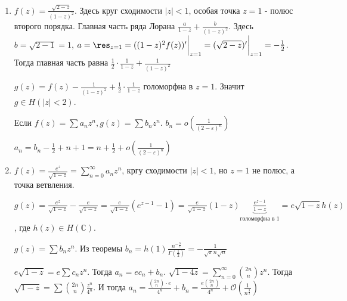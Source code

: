 \begin{example}
    \begin{enumerate}
        \item {
            $f(z) = \frac{\sqrt{2 - z}}{(1 - z)^2}$. Здесь круг сходимости $|z| < 1$, особая точка $z = 1$ - полюс второго порядка. Главная 
            часть ряда Лорана $\frac{a}{1 - z} + \frac{b}{(1 - z)^2}$. Здесь $b = \sqrt{2 - 1} = 1$, $a = \res_{z = 1} = ((1 - z)^2 f(z))' \bigg |_{z = 1} = (\sqrt{2 - z})' \bigg |_{z = 1} = -\frac{1}{2}$. Тогда
            главная часть равна $\frac{1}{2} \cdot \frac{1}{1 - z} + \frac{1}{(1 - z)^2}$

            $g(z) = f(z) - \frac{1}{(1 - z)^2} + \frac{1}{2} \cdot \frac{1}{1 - z}$ голоморфна в $z = 1$. Значит $g \in H(|z| < 2)$.

            Если $f(z) = \sum a_n z^n, g(z) = \sum b_n z^n$. $b_n = o\left ( \frac{1}{(2 - \varepsilon)^n} \right )$

            $a_n = b_n - \frac{1}{2} + n + 1 = n + \frac{1}{2} + o \left ( \frac{1}{(2 - \varepsilon)^n} \right )$
        }
        \item {
            $f(z) = \frac{e^z}{\sqrt{1 - z}} = \sum_{n = 0}^{\infty} a_n z^n$, кргу сходимости $|z| < 1$, но $z = 1$ не полюс, а точка ветвления.

            $g(z) = \frac{e^z}{\sqrt{1 - z}} - \frac{e}{\sqrt{1 - z}} = \frac{e}{\sqrt{1 - z}} (e^{z - 1} - 1) = \frac{e}{\sqrt{1 - z}} (1 - z) \underbrace{\frac{e^{z - 1}}{1 - z}}_{\text{голоморфна в 1}} = e\sqrt{1 - z} h(z)$, где $h(z) \in H(\mathbb{C})$.

            $g(z) = \sum b_n z^n$. Из теоремы $b_n = h(1) \frac{n^{-\frac{3}{2}}}{\Gamma (\frac{1}{2})} = - \frac{1}{\sqrt{\pi} n\sqrt{n}}$

            $e\sqrt{1 - z} = e \sum c_n z^n$. Тогда $a_n = ec_n + b_n$. $\sqrt{1 - 4z} = \sum_{n=0}^{\infty} \binom{2n}{n} z^n$. Тогда $\sqrt{1 - z} = \sum \binom{2n}{n} \frac{z^n}{4^n}$. И тогда
            $a_n = \frac{\binom{2n}{n} \cdot e}{4^n} + b_n = \frac{e \binom{2n}{n}}{4^n} + \mathcal{O}(\frac{1}{n^{\frac{3}{2}}})$
        }
    \end{enumerate}
\end{example}

